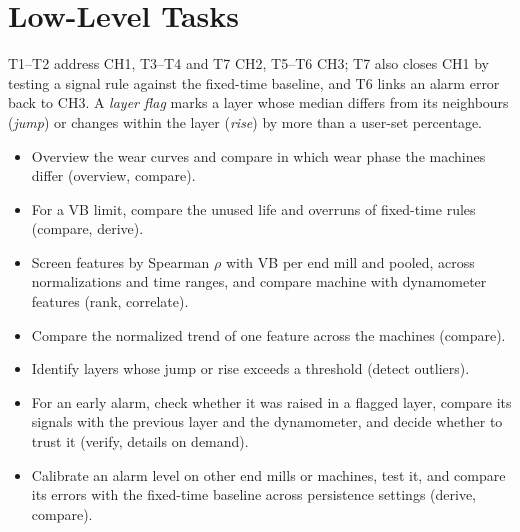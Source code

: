 \documentclass{vgtc}                          %
\begin{document}
\section{Low-Level Tasks}
\label{sec:tasks}
T1--T2 address CH1, T3--T4 and T7 CH2, T5--T6 CH3; T7 also closes CH1 by testing a signal rule against the fixed-time
baseline, and T6 links an alarm error back to CH3. A \emph{layer flag} marks a layer whose median differs from its
neighbours (\emph{jump}) or changes within the layer (\emph{rise}) by more than a user-set percentage.
\begin{itemize}
  \item[\textbf{T1}] Overview the wear curves and compare in which wear phase the machines differ (overview, compare).
  \item[\textbf{T2}] For a VB limit, compare the unused life and overruns of fixed-time rules (compare, derive).
  \item[\textbf{T3}] Screen features by Spearman $\rho$ with VB per end mill and pooled, across normalizations and time ranges, and compare machine with dynamometer features (rank, correlate).
  \item[\textbf{T4}] Compare the normalized trend of one feature across the machines (compare).
  \item[\textbf{T5}] Identify layers whose jump or rise exceeds a threshold (detect outliers).
  \item[\textbf{T6}] For an early alarm, check whether it was raised in a flagged layer, compare its signals with the previous layer and the dynamometer, and decide whether to trust it (verify, details on demand).
  \item[\textbf{T7}] Calibrate an alarm level on other end mills or machines, test it, and compare its errors with the fixed-time baseline across persistence settings (derive, compare).
\end{itemize}

\end{document}
